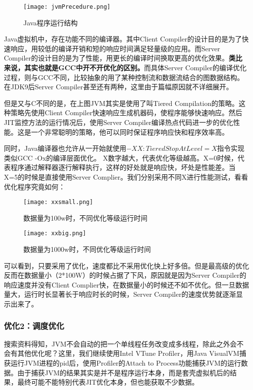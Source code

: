 \documentclass[11pt]{article}
\begin{document}
\begin{figure}[H]
  \centering
  \texttt{[image: jvmPrecedure.png]}
  \caption{Java程序运行结构}
  \label{fig:example}
\end{figure}


Java虚拟机中，存在功能不同的编译器。其中Client Compiler的设计目的是为了快速响应，用较低的编译开销和短的响应时间满足轻量级的应用。而Server Compiler的设计目的是为了性能，用更长的编译时间换取更高的优化效果。\textbf{类比来说，其实也就是GCC中开不开优化的区别。}而具体Server Compiler的编译优化过程，则与GCC不同，比较抽象的用了某种控制流和数据流结合的图数据结构。在JDK9后Server Compiler甚至还有两种，这里由于篇幅原因就不详细展开。


但是又与C不同的是，在上图JVM其实是使用了叫Tiered Compilation的策略。这种策略先使用Client Compiler快速响应生成机器码，使程序能够快速响应。然后JIT监控方法的运行情况后，使用Server Compiler编译热点代码进一步的优化性能。这是一个非常聪明的策略，他可以同时保证程序响应快和程序效率高。


同时，Java编译器也允许从一开始就使用$-XX:TieredStopAtLevel=X$指令实现类似GCC -Ox的编译层面优化。
X数字越大，代表优化等级越高。X=0时候，代表程序通过解释器逐行解释执行，这样的好处就是响应快，坏处是性能差。当X=5的时候是直接使用Server Complier。我们分别采用不同X进行性能测试，看看优化程序究竟如何：


\begin{figure}[H]
  \centering
  \texttt{[image: xxsmall.png]}
  \caption{数据量为100w时，不同优化等级运行时间}
  \label{fig:example}
\end{figure}


\begin{figure}[H]
  \centering
  \texttt{[image: xxbig.png]}
  \caption{数据量为1000w时，不同优化等级运行时间}
  \label{fig:example}
\end{figure}


可以看到，只要采用了优化，速度都比不采用优化快上好多倍。但是最高级的优化反而在数据量小（2*100W）的时候占据了下风，原因就是因为Server Compiler的响应速度并没有Client Complier快，在数据量小的时候还不如不优化。但一旦数据量大，运行时长显著长于响应时长的时候，Server Compiler的速度优势就逐渐显示出来了。

\subsubsection{优化2：调度优化}
搜索资料得知，JVM不会自动的把一个单线程任务改变成多线程，除此之外会不会有其他优化呢？这里，我们继续使用Intel VTune Profiler，用Java VisualVM捕获运行JVM进程的pid后，使用Profiler的Attach to Process功能捕获JVM的运行数据。由于捕获JVM的结果其实是并不是程序运行本身，而是套壳虚拟机后的结果，最终可能不能特别代表JIT优化本身，但也能获取不少数据。
\end{document}
